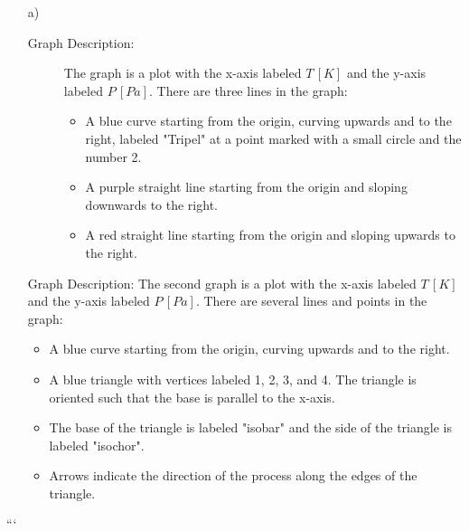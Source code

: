 \begin{itemize}
    \item[a)] 
    \begin{description}
        \item[Graph Description:] 
        The graph is a plot with the x-axis labeled \( T \, [K] \) and the y-axis labeled \( P \, [Pa] \). There are three lines in the graph:
        \begin{itemize}
            \item A blue curve starting from the origin, curving upwards and to the right, labeled "Tripel" at a point marked with a small circle and the number 2.
            \item A purple straight line starting from the origin and sloping downwards to the right.
            \item A red straight line starting from the origin and sloping upwards to the right.
        \end{itemize}
    \end{description}
    
    \item[Graph Description:] 
    The second graph is a plot with the x-axis labeled \( T \, [K] \) and the y-axis labeled \( P \, [Pa] \). There are several lines and points in the graph:
    \begin{itemize}
        \item A blue curve starting from the origin, curving upwards and to the right.
        \item A blue triangle with vertices labeled 1, 2, 3, and 4. The triangle is oriented such that the base is parallel to the x-axis.
        \item The base of the triangle is labeled "isobar" and the side of the triangle is labeled "isochor".
        \item Arrows indicate the direction of the process along the edges of the triangle.
    \end{itemize}
\end{itemize}

```